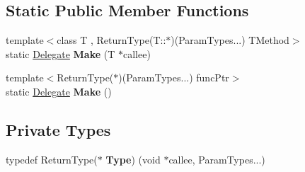 \subsection*{Static Public Member Functions}
\begin{DoxyCompactItemize}
\item 
{\footnotesize template$<$class T , Return\+Type(\+T\+::$\ast$)(\+Param\+Types...) T\+Method$>$ }\\static \hyperlink{class_ensum_1_1_delegate}{Delegate} {\bfseries Make} (T $\ast$callee)\hypertarget{class_ensum_1_1_delegate_3_01_return_type_07_param_types_8_8_8_08_4_a33d5bd259c40a08b2ac401a0552162e1}{}\label{class_ensum_1_1_delegate_3_01_return_type_07_param_types_8_8_8_08_4_a33d5bd259c40a08b2ac401a0552162e1}

\item 
{\footnotesize template$<$Return\+Type($\ast$)(\+Param\+Types...) func\+Ptr$>$ }\\static \hyperlink{class_ensum_1_1_delegate}{Delegate} {\bfseries Make} ()\hypertarget{class_ensum_1_1_delegate_3_01_return_type_07_param_types_8_8_8_08_4_afc8561e5caf8588aedcfc954aa1eea89}{}\label{class_ensum_1_1_delegate_3_01_return_type_07_param_types_8_8_8_08_4_afc8561e5caf8588aedcfc954aa1eea89}

\end{DoxyCompactItemize}
\subsection*{Private Types}
\begin{DoxyCompactItemize}
\item 
typedef Return\+Type($\ast$ {\bfseries Type}) (void $\ast$callee, Param\+Types...)\hypertarget{class_ensum_1_1_delegate_3_01_return_type_07_param_types_8_8_8_08_4_a5503bf2523d8be839ac47fdb49946f37}{}\label{class_ensum_1_1_delegate_3_01_return_type_07_param_types_8_8_8_08_4_a5503bf2523d8be839ac47fdb49946f37}

\end{DoxyCompactItemize}
